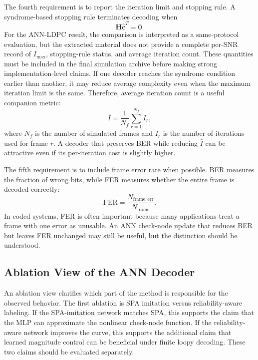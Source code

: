 The fourth requirement is to report the iteration limit and stopping rule. A syndrome-based stopping rule terminates decoding when
\begin{equation}
  \mathbf{H}\hat{\mathbf{c}}^T=\mathbf{0}.
\end{equation}
For the ANN-LDPC result, the comparison is interpreted as a same-protocol evaluation, but the extracted material does not provide a complete per-SNR record of $I_{\max}$, stopping-rule status, and average iteration count. These quantities must be included in the final simulation archive before making strong implementation-level claims. If one decoder reaches the syndrome condition earlier than another, it may reduce average complexity even when the maximum iteration limit is the same. Therefore, average iteration count is a useful companion metric:
\begin{equation}
  \bar{I}=\frac{1}{N_f}\sum_{r=1}^{N_f}I_r,
\end{equation}
where $N_f$ is the number of simulated frames and $I_r$ is the number of iterations used for frame $r$. A decoder that preserves BER while reducing $\bar{I}$ can be attractive even if its per-iteration cost is slightly higher.

The fifth requirement is to include frame error rate when possible. BER measures the fraction of wrong bits, while FER measures whether the entire frame is decoded correctly:
\begin{equation}
  \mathrm{FER}=\frac{N_{\mathrm{frame,err}}}{N_{\mathrm{frame}}}.
\end{equation}
In coded systems, FER is often important because many applications treat a frame with one error as unusable. An ANN check-node update that reduces BER but leaves FER unchanged may still be useful, but the distinction should be understood.

\subsection{Ablation View of the ANN Decoder}
An ablation view clarifies which part of the method is responsible for the observed behavior. The first ablation is SPA imitation versus reliability-aware labeling. If the SPA-imitation network matches SPA, this supports the claim that the MLP can approximate the nonlinear check-node function. If the reliability-aware network improves the curve, this supports the additional claim that learned magnitude control can be beneficial under finite loopy decoding. These two claims should be evaluated separately.

